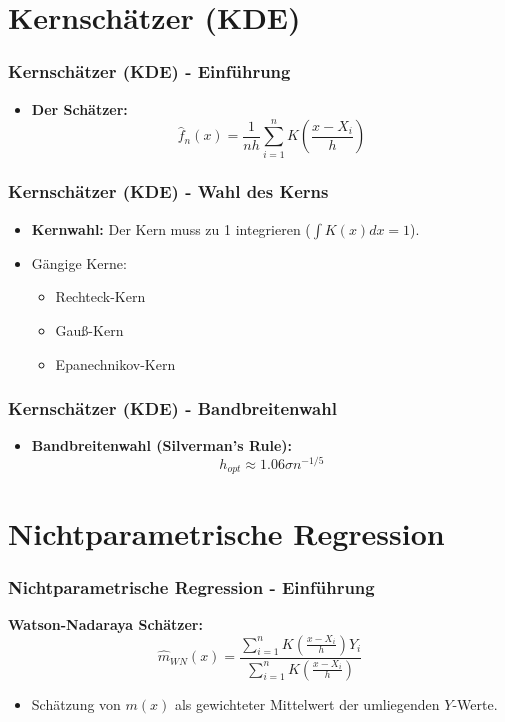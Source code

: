 \documentclass{beamer}
\begin{document}
\section{Kernschätzer (KDE)}

\begin{frame}
	\frametitle{Kernschätzer (KDE) - Einführung}
	
	\begin{itemize}
		\item \textbf{Der Schätzer:}
		\begin{equation}
			\hat{f}_n(x) = \frac{1}{nh} \sum_{i=1}^{n} K\left(\frac{x - X_i}{h}\right)
		\end{equation}
	\end{itemize}
\end{frame}

\begin{frame}
	\frametitle{Kernschätzer (KDE) - Wahl des Kerns}
	
	\begin{itemize}
		\item \textbf{Kernwahl:} Der Kern muss zu 1 integrieren ($\int K(x) dx = 1$).
		\item Gängige Kerne:
		\begin{itemize}
			\item Rechteck-Kern
			\item Gauß-Kern
			\item Epanechnikov-Kern
		\end{itemize}
	\end{itemize}
\end{frame}

\begin{frame}
	\frametitle{Kernschätzer (KDE) - Bandbreitenwahl}
	
	\begin{itemize}
		\item \textbf{Bandbreitenwahl (Silverman's Rule):}
		\begin{equation}
			h_{opt} \approx 1.06 \sigma n^{-1/5}
		\end{equation}
	\end{itemize}
\end{frame}

\section{Nichtparametrische Regression}

\begin{frame}
	\frametitle{Nichtparametrische Regression - Einführung}
	
	\textbf{Watson-Nadaraya Schätzer:}
	\begin{equation}
		\hat{m}_{WN}(x) = \frac{\sum_{i=1}^n K\left(\frac{x - X_i}{h}\right) Y_i}{\sum_{i=1}^n K\left(\frac{x - X_i}{h}\right)}
	\end{equation}
	\begin{itemize}
		\item Schätzung von $m(x)$ als gewichteter Mittelwert der umliegenden $Y$-Werte.
	\end{itemize}
\end{frame}
\end{document}

